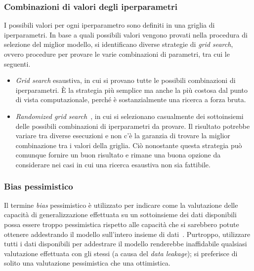 \subsubsection{Combinazioni di valori degli iperparametri}
I possibili valori per ogni iperparametro sono definiti in una griglia di iperparametri.
In base a quali possibili valori vengono provati nella procedura di selezione del miglior modello, si identificano diverse strategie di \emph{grid search}, ovvero procedure per provare le varie combinazioni di parametri, tra cui le seguenti.
\begin{itemize}
    \item \emph{Grid search} esaustiva, in cui si provano tutte le possibili combinazioni di iperparametri. \`E la strategia più semplice ma anche la più costosa dal punto di vista computazionale, perché è sostanzialmente una ricerca a forza bruta.
    \item \emph{Randomized grid search}~\cite{random_grid_search}, in cui si selezionano casualmente dei sottoinsiemi delle possibili combinazioni di iperparametri da provare. Il risultato potrebbe variare tra diverse esecuzioni e non c'è la garanzia di trovare la miglior combinazione tra i valori della griglia.
    Ciò nonostante questa strategia può comunque fornire un buon risultato e rimane una buona opzione da considerare nei casi in cui una ricerca esaustiva non sia fattibile. 
\end{itemize}


\subsubsection{Bias pessimistico} Il termine \emph{bias} pessimistico è utilizzato per indicare come la valutazione delle capacità di generalizzazione effettuata su un sottoinsieme dei dati disponibili possa essere troppo pessimistica rispetto alle capacità che si sarebbero potute ottenere addestrando il modello sull'intero insieme di dati~\cite{model_evaluation}.
Purtroppo, utilizzare tutti i dati disponibili per addestrare il modello renderebbe inaffidabile qualsiasi valutazione effettuata con gli stessi (a causa del \emph{data leakage}); si preferisce di solito una valutazione pessimistica che una ottimistica.


